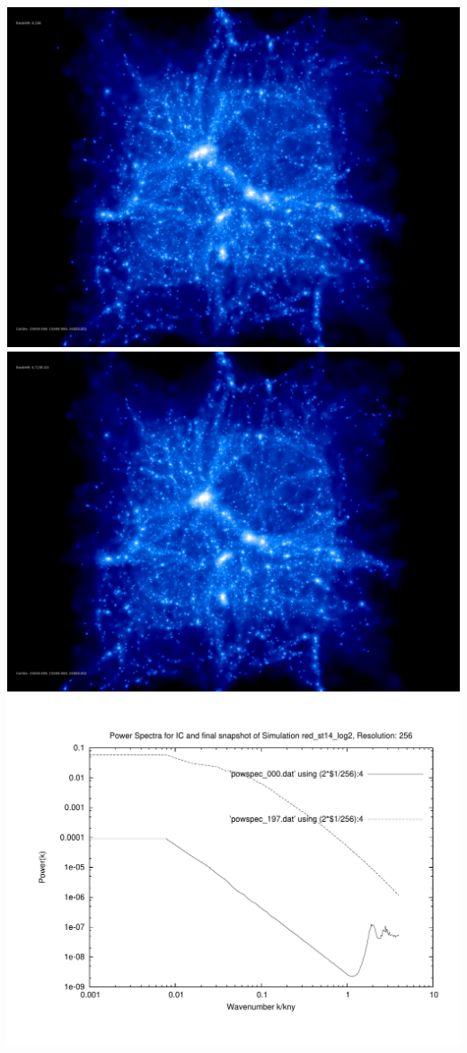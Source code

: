 \includegraphics[scale=0.1]{r256/h100/red_st14_log2/150.jpg} 
\includegraphics[scale=0.1]{r256/h100/red_st14_log2/197.jpg} \\ 

\includegraphics[scale=0.5]{r256/h100/red_st14_log2/plot_powspec_red_st14_log2.pdf}

